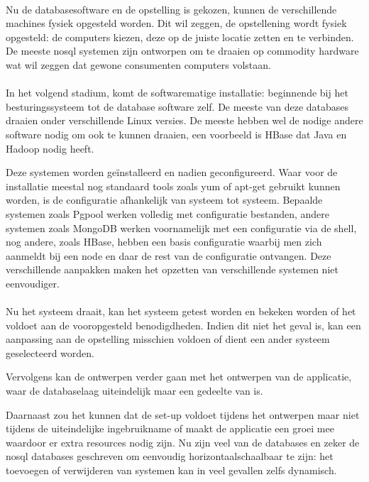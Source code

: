 \paragraph{} Nu de databasesoftware en de opstelling is gekozen, kunnen de verschillende machines fysiek opgesteld worden. Dit wil zeggen, de opstellening wordt fysiek opgesteld: de computers kiezen, deze op de juiste locatie zetten en te verbinden. De meeste \gls{nosql} systemen zijn ontworpen om te draaien op commodity hardware wat wil zeggen dat gewone consumenten computers volstaan. 

\paragraph{} In het volgend stadium, komt de softwarematige installatie: beginnende bij het besturingssysteem tot de database software zelf. De meeste van deze databases draaien onder verschillende Linux versies. De meeste hebben wel de nodige andere software nodig om ook te kunnen draaien, een voorbeeld is HBase dat Java en Hadoop nodig heeft. 

Deze systemen worden geïnstalleerd en nadien geconfigureerd. Waar voor de installatie meestal nog standaard tools zoals \gls{yum} of \gls{apt-get} gebruikt kunnen worden, is de configuratie afhankelijk van systeem tot systeem. Bepaalde systemen zoals Pgpool werken volledig met configuratie bestanden, andere systemen zoals MongoDB werken voornamelijk met een configuratie via de shell, nog andere, zoals HBase, hebben een basis configuratie waarbij men zich aanmeldt bij een node en daar de rest van de configuratie ontvangen. Deze verschillende aanpakken maken het opzetten van verschillende systemen niet eenvoudiger.

\paragraph{} Nu het systeem draait, kan het systeem getest worden en bekeken worden of het voldoet aan de vooropgesteld benodigdheden. Indien dit niet het geval is, kan een aanpassing aan de opstelling misschien voldoen of dient een ander systeem geselecteerd worden. 

Vervolgens kan de ontwerpen verder gaan met het ontwerpen van de applicatie, waar de databaselaag uiteindelijk maar een gedeelte van is. 

Daarnaast zou het kunnen dat de set-up voldoet tijdens het ontwerpen maar niet tijdens de uiteindelijke ingebruikname of maakt de applicatie een groei mee waardoor er extra resources nodig zijn. Nu zijn veel van de databases en zeker de \gls{nosql} databases geschreven om eenvoudig \gls{horizontaalschaalbaar} te zijn: het toevoegen of verwijderen van systemen kan in veel gevallen zelfs dynamisch. 

